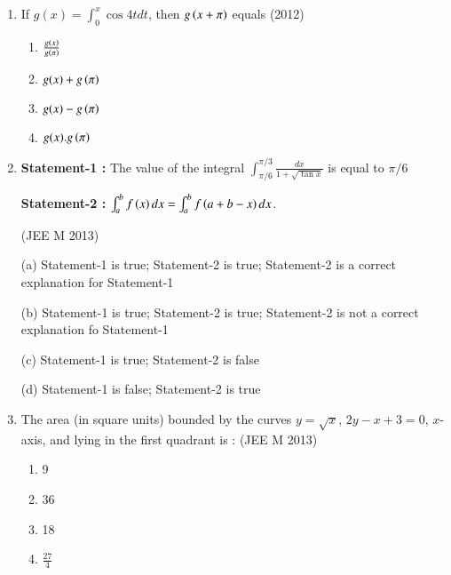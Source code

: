 \documentclass[journal,12pt,twocolumn]{IEEEtran}
\theoremstyle{remark}
\begin{document}
\begin{enumerate}[label=\textcolor{black}{\arabic*.}]
		\begin{multicols}{4}
			\begin{enumerate}[label=(\alph*)]
				\item $20\sqrt{2}$
				\item $\frac{10\sqrt{2}}{3}$
				\item $\frac{20\sqrt{2}}{3}$
				\item $10\sqrt{2}$
			\end{enumerate}
		\end{multicols}


	\item If $g(x)=\int_0^x\cos 4t dt$, then $g\left(x+\pi\right)$ equals
		\hfill{(2012)}

		\begin{multicols}{2}
			\begin{enumerate}[label=(\alph*)]
				\item $\frac{g(x)}{g\left(\pi\right)}$
				\item $g(x)+g\left(\pi\right)$
				\item $g(x)-g\left(\pi\right)$
				\item $g(x).g\left(\pi\right)$
			\end{enumerate}
		\end{multicols}


	\item \textbf{Statement-1 :} The value of the integral $\int_{\pi/6}^{\pi/3}\frac{dx}{1+\sqrt{\tan x}}$ is equal to $\pi/6$

		\textbf{Statement-2 :} $\int_a^bf\left(x\right)dx=\int_a^bf\left(a+b-x\right)dx$.

		\hfill{(JEE M 2013)}
		
		(a) Statement-1 is true; Statement-2 is true; Statement-2 is a correct explanation for Statement-1

		(b) Statement-1 is true; Statement-2 is true; Statement-2 is not a correct explanation fo Statement-1

		(c) Statement-1 is true; Statement-2 is false

		(d) Statement-1 is false; Statement-2 is true


	\item The area (in square units) bounded by the curves $y=\sqrt{x}$, $2y-x+3=0$, $x$-axis, and lying in the first quadrant is :
		\hfill{(JEE M 2013)}

		\begin{multicols}{4}
			\begin{enumerate}[label=(\alph*)]
				\item 9
				\item 36
				\item 18
				\item $\frac{27}{4}$
			\end{enumerate}
		\end{multicols}



\end{enumerate}
\end{document}
